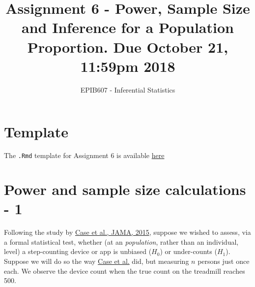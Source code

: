 \documentclass[letterpaper,9pt,twoside,printwatermark=false]{pinp}
\title{Assignment 6 - Power, Sample Size and Inference for a Population
Proportion. Due October 21, 11:59pm 2018}
\author[a]{EPIB607 - Inferential Statistics}
\affil[a]{Fall 2018, McGill University}
\begin{document}
\verticaladjustment{-2pt}

\maketitle
\thispagestyle{firststyle}



\section*{Template}\label{template}

The \texttt{.Rmd} template for Assignment 6 is available
\href{https://github.com/sahirbhatnagar/EPIB607/raw/master/assignments/a6/a6_template.Rmd}{here}

\section{Power and sample size calculations -
1}\label{power-and-sample-size-calculations---1}

Following the study by
\href{http://www.medicine.mcgill.ca/epidemiology/hanley/bios601/Surveys/SmartphoneSteps.pdf}{Case
et al., JAMA, 2015}, suppose we wished to assess, via a formal
statistical test, whether (at an \textit{population}, rather than an
individual, level) a step-counting device or app is unbiased (\(H_0\))
or under-counts (\(H_1\)). Suppose we will do so the way
\href{http://www.medicine.mcgill.ca/epidemiology/hanley/bios601/Surveys/SmartphoneSteps.pdf}{Case
et al.} did, but measuring \(n\) persons just once each. We observe the
device count when the true count on the treadmill reaches 500.
\end{document}
